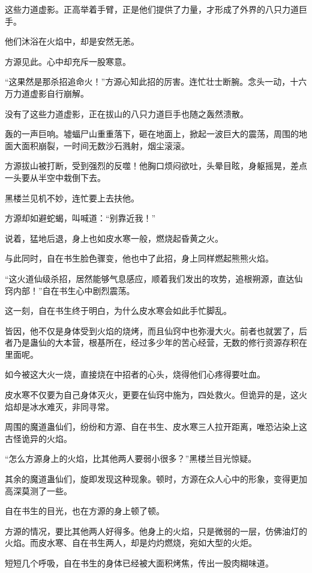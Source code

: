 \begin{this_body}
这些力道虚影。正高举着手臂，正是他们提供了力量，才形成了外界的八只力道巨手。

他们沐浴在火焰中，却是安然无恙。

方源见此。心中却充斥一股寒意。

“这果然是那杀招追命火！”方源心知此招的厉害。连忙壮士断腕。念头一动，十六万力道虚影自行崩解。

没有了这些力道虚影，正在拔山的八只力道巨手也随之轰然溃散。

轰的一声巨响。墟蝠尸山重重落下，砸在地面上，掀起一波巨大的震荡，周围的地面大面积崩裂，一时间无数沙石溅射，烟尘滚滚。

方源拔山被打断，受到强烈的反噬！他胸口烦闷欲吐，头晕目眩，身躯摇晃，差点一头要从半空中栽倒下去。

黑楼兰见机不妙，连忙要上去扶他。

方源却如避蛇蝎，叫喊道：“别靠近我！”

说着，猛地后退，身上也如皮水寒一般，燃烧起昏黄之火。

与此同时，自在书生脸色骤变，他也中了此招，身上同样燃起熊熊火焰。

“这火道仙级杀招，居然能够气息感应，顺着我们发出的攻势，追根朔源，直达仙窍内部！”自在书生心中剧烈震荡。

这一刻，自在书生终于明白，为什么皮水寒会如此手忙脚乱。

皆因，他不仅是身体受到火焰的烧烤，而且仙窍中也弥漫大火。前者也就罢了，后者乃是蛊仙的大本营，根基所在，经过多少年的苦心经营，无数的修行资源存积在里面呢。

如今被这大火一烧，直接烧在中招者的心头，烧得他们心疼得要吐血。

皮水寒不仅要为自己身体灭火，更要在仙窍中施为，四处救火。但诡异的是，这火焰却是冰水难灭，非同寻常。

周围的魔道蛊仙们，纷纷和方源、自在书生、皮水寒三人拉开距离，唯恐沾染上这古怪诡异的火焰。

“怎么方源身上的火焰，比其他两人要弱小很多？”黑楼兰目光惊疑。

其余的魔道蛊仙们，旋即发现这种现象。顿时，方源在众人心中的形象，变得更加高深莫测了一些。

自在书生的目光，也在方源的身上顿了顿。

方源的情况，要比其他两人好得多。他身上的火焰，只是微弱的一层，仿佛油灯的火焰。而皮水寒、自在书生两人，却是灼灼燃烧，宛如大型的火炬。

短短几个呼吸，自在书生的身体已经被大面积烤焦，传出一股肉糊味道。


\end{this_body}
